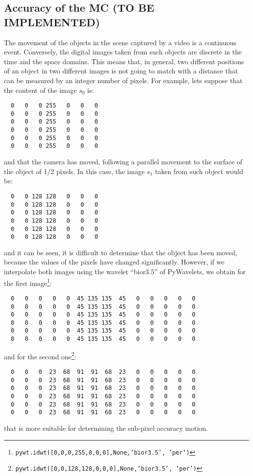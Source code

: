 \subsection{Accuracy of the MC (TO BE IMPLEMENTED)}
The movement of the objects in the scene captured by a video is a
continuous event. Conversely, the digital images taken from such
objects are discrete in the time and the space domains. This means
that, in general, two different positions of an object in two
different images is not going to match with a distance that can be
measured by an integer number of pixels. For example, lets suppose that the content of the image $s_0$ is:
\begin{verbatim}
  0   0   0 255   0   0   0
  0   0   0 255   0   0   0
  0   0   0 255   0   0   0
  0   0   0 255   0   0   0
  0   0   0 255   0   0   0
  0   0   0 255   0   0   0
\end{verbatim}
and that the camera has moved, following a parallel movement to the
surface of the object of 1/2 pixels. In this case, the image $s_1$
taken from such object would be:
\begin{verbatim}
  0   0 128 128   0   0   0
  0   0 128 128   0   0   0
  0   0 128 128   0   0   0
  0   0 128 128   0   0   0
  0   0 128 128   0   0   0
  0   0 128 128   0   0   0
\end{verbatim}
and it can be seen, it is difficult to determine that the object has
been moved, because the values of the pixels have changed
significantly. However, if we interpolate both images using the
wavelet ``bior3.5'' of PyWavelets, we obtain for the first
image\footnote{\texttt{pywt.idwt([0,0,0,255,0,0,0],None,'bior3.5',
    'per')}}:
\begin{verbatim}
  0   0   0   0   0  45 135 135  45   0   0   0   0   0
  0   0   0   0   0  45 135 135  45   0   0   0   0   0
  0   0   0   0   0  45 135 135  45   0   0   0   0   0
  0   0   0   0   0  45 135 135  45   0   0   0   0   0
  0   0   0   0   0  45 135 135  45   0   0   0   0   0
  0   0   0   0   0  45 135 135  45   0   0   0   0   0
\end{verbatim}
and for the second
one\footnote{\texttt{pywt.idwt([0,0,128,128,0,0,0],None,'bior3.5',
    'per')}}:
\begin{verbatim}
  0   0   0  23  68  91  91  68  23   0   0   0   0   0
  0   0   0  23  68  91  91  68  23   0   0   0   0   0
  0   0   0  23  68  91  91  68  23   0   0   0   0   0
  0   0   0  23  68  91  91  68  23   0   0   0   0   0
  0   0   0  23  68  91  91  68  23   0   0   0   0   0
  0   0   0  23  68  91  91  68  23   0   0   0   0   0
\end{verbatim}
that is more suitable for determining the sub-pixel accuracy motion.

